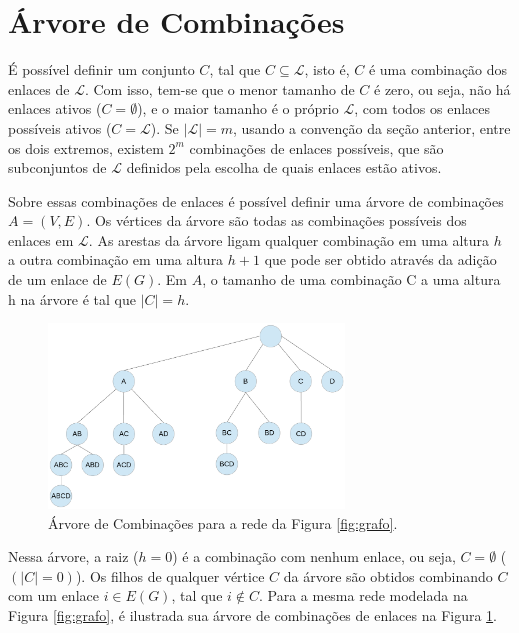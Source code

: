 \section{Árvore de Combinações}
\label{section:trees}

É possível definir um conjunto $C$, tal que $C \subseteq \mathcal{L}$, isto é, $C$ é uma combinação dos enlaces de $\mathcal{L}$. Com isso, tem-se que o menor tamanho de $C$ é zero, ou seja, não há enlaces ativos ($C=\emptyset$), e o maior tamanho é o próprio $\mathcal{L}$, com todos os enlaces possíveis ativos ($C=\mathcal{L}$). Se $|\mathcal{L}|=m$, usando a convenção da seção anterior, entre os dois extremos, existem $2^m$ combinações de enlaces possíveis, que são subconjuntos de $\mathcal{L}$ definidos pela escolha de quais enlaces estão ativos.

Sobre essas combinações de enlaces é possível definir uma árvore de combinações $A=(V,E)$. Os vértices da árvore são todas as combinações possíveis dos enlaces em $\mathcal{L}$. As arestas da árvore ligam qualquer combinação em uma altura $h$ a outra combinação em uma altura $h+1$ que pode ser obtido através da adição de um enlace de $E(G)$. Em $A$, o tamanho de uma combinação C a uma altura h na árvore é tal que $|C|=h$.

\begin{figure}[htb]
\centering
\includegraphics[width=0.7\textwidth]{figs/arvore}
\caption[Árvore de Combinações para a rede da Figura \ref{fig:grafo}.]
{Árvore de Combinações para a rede da Figura \ref{fig:grafo}.}
\label{fig:arvore}
\end{figure}

Nessa árvore, a raiz ($h=0$) é a combinação com nenhum enlace, ou seja, $C=\emptyset$ ($(|C|=0)$). Os filhos de qualquer vértice $C$ da árvore são obtidos combinando $C$ com um enlace $i \in E(G)$, tal que $i \notin C$. Para a mesma rede modelada na Figura \ref{fig:grafo}, é ilustrada sua árvore de combinações de enlaces na Figura \ref{fig:arvore}.

